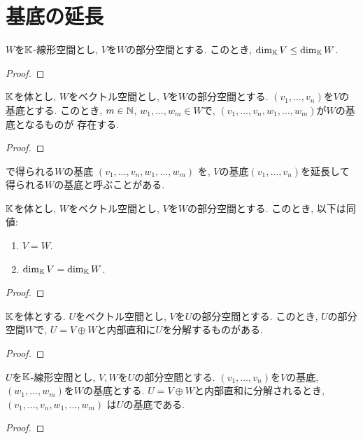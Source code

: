 \section{基底の延長}
\begin{prop}
  $W$を$\mathbb{K}$-線形空間とし, $V$を$W$の部分空間とする.
  このとき,  $\dim_{\mathbb{K}} V \leq \dim_{\mathbb{K}} W$.
\end{prop}
\begin{proof}\end{proof}


\begin{prop}
\label{prop:basis:ext}
$\mathbb{K}$を体とし,
  $W$をベクトル空間とし, $V$を$W$の部分空間とする.
  $(v_1,\ldots,v_n)$を$V$の基底とする.
  このとき,
  $m\in \mathbb{N}$,
  $w_1,\ldots,w_m\in W$で,
  $(v_1,\ldots,v_n,w_1,\ldots,w_m)$が$W$の基底となるものが
  存在する.  
\end{prop}
\begin{proof}\end{proof}
\begin{remark}
で得られる$W$の基底
  $(v_1,\ldots,v_n,w_1,\ldots,w_m)$
  を,
  $V$の基底$(v_1,\ldots,v_n)$を延長して得られる$W$の基底と呼ぶことがある.
\end{remark}

\begin{cor}
$\mathbb{K}$を体とし,
  $W$をベクトル空間とし, $V$を$W$の部分空間とする.
  このとき, 以下は同値:
  \begin{enumerate}
   \item $V = W$.
   \item $\dim_{\mathbb{K}} V = \dim_{\mathbb{K}} W$.
  \end{enumerate}
\end{cor}
\begin{proof}\end{proof}

\begin{prop}
$\mathbb{K}$を体とする.
  $U$をベクトル空間とし, $V$を$U$の部分空間とする.
  このとき, $U$の部分空間$W$で,
  $U=V\oplus W$と内部直和に$U$を分解するものがある.
\end{prop}
\begin{proof}\end{proof}

\begin{prop}
  $U$を$\mathbb{K}$-線形空間とし, $V, W$を$U$の部分空間とする.
  $(v_1,\ldots,v_n)$を$V$の基底,
  $(w_1,\ldots,w_m)$を$W$の基底とする.
  $U=V\oplus W$と内部直和に分解されるとき,
  $(v_1,\ldots,v_n,w_1,\ldots,w_m)$
  は$U$の基底である.
\end{prop}
\begin{proof}\end{proof}

